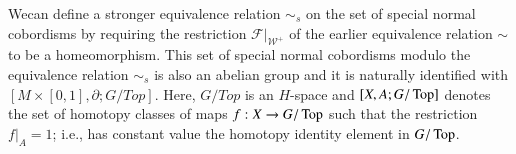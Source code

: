 We\pageoriginale can define a stronger equivalence relation $\sim_s$
on the set of special normal cobordisms by requiring the restriction
$\mathcal{F}|_{\mathcal{W}^+}$ of the earlier equivalence relation
$\sim$ to be a homeomorphism. This set of special normal cobordisms
modulo the equivalence relation $\sim_s$ is also an abelian group and
it is naturally identified with $[M \times [0, 1], \partial ;
  G/Top]$. Here, $G/Top$ is an $H$-space and $[X, A; G/\operatorname{Top}]$ denotes
the set of homotopy classes of maps $f: X \to G/\operatorname{Top}$ such that
the restriction $f|_{A}=1$; i.e., has constant value the homotopy
identity element in $G/\operatorname{Top}$.

